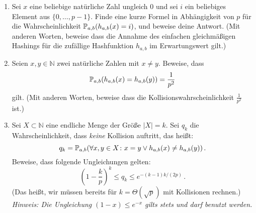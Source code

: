 \documentclass{uebung_cs}
\begin{document}
\begin{aufgabe}
  \begin{enumerate}
      \item Sei $x$ eine beliebige natürliche Zahl ungleich $0$ und sei $i$ ein beliebiges Element aus $\{0,\dots,p-1\}$.
      Finde eine kurze Formel in Abhängigkeit von $p$ für die Wahrscheinlichkeit $\mathbb P_{a,b}(h_{a,b}(x)=i)$, und beweise deine Antwort. (Mit anderen Worten, beweise dass die Annahme des einfachen gleichmäßigen Hashings für die zufällige Hashfunktion $h_{a,b}$ im Erwartungswert gilt.)
      \item Seien $x,y\in\mathbb N$ zwei natürliche Zahlen mit $x\ne y$.
      Beweise, dass \[\mathbb P_{a,b}(h_{a,b}(x)=h_{a,b}(y))=\frac{1}{p^2}\] gilt. (Mit anderen Worten, beweise dass die Kollisionswahrscheinlichkeit $\frac{1}{p^2}$ ist.)
      \item Sei $X\subset\mathbb N$ eine endliche Menge der Größe $|X|=k$. Sei $q_k$ die Wahrscheinlichkeit, dass \emph{keine} Kollision auftritt, das heißt:
      \[q_k=\mathbb P_{a,b}(\forall x,y\in X\colon x=y \vee h_{a,b}(x)\ne h_{a,b}(y))\,.\]
      Beweise, dass folgende Ungleichungen gelten:
      \[
          \left(1-\frac{k}{p}\right)^k\le q_k \leq e^{-(k-1)k/(2p)}\,.
      \]
      (Das heißt, wir müssen bereits für $k=\Theta(\sqrt{p})$ mit Kollisionen rechnen.)\\
      \emph{Hinweis: Die Ungleichung $(1-x)\le e^{-x}$ gilts stets und darf benutzt werden.}
  \end{enumerate}
  

\end{aufgabe}
\end{document}
